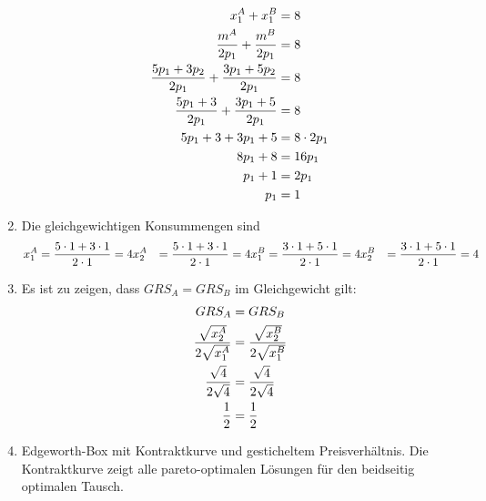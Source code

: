\documentclass{article}
\begin{document}
\begin{enumerate}[label=(\alph*)]
		\begin{align}
			x_1^A + x_1^B &= 8 \notag \\
			\frac{m^A}{2p_1} + \frac{m^B}{2p_1} &= 8 \notag \\
			\frac{5p_1 + 3p_2}{2p_1} + \frac{3p_1 + 5p_2}{2p_1} &= 8 \notag \\
			\frac{5p_1 + 3}{2p_1} + \frac{3p_1 + 5}{2p_1} &= 8 \notag \\
			5p_1 + 3 + 3p_1 + 5 &= 8\cdot 2p_1 \notag \\
			8p_1 + 8 &= 16p_1 \notag \\
			p_1 + 1 &= 2p_1 \notag \\
			p_1 &= 1 \notag
		\end{align}
		\item Die gleichgewichtigen Konsummengen sind
		\begin{align}
			x_1^A &= \frac{5\cdot 1 + 3\cdot 1}{2\cdot 1} = 4 \notag
			x_2^A &= \frac{5\cdot 1 + 3\cdot 1}{2\cdot 1} = 4 \notag
			x_1^B &= \frac{3\cdot 1 + 5\cdot 1}{2\cdot 1} = 4 \notag
			x_2^B &= \frac{3\cdot 1 + 5\cdot 1}{2\cdot 1} = 4 \notag
		\end{align}
		\item Es ist zu zeigen, dass $GRS_A=GRS_B$ im Gleichgewicht gilt:
		\begin{align}
			GRS_A &= GRS_B \notag \\
			\frac{\sqrt{x_2^A}}{2\sqrt{x_1^A}} &= \frac{\sqrt{x_2^B}}{2\sqrt{x_1^B}} \notag \\
			\frac{\sqrt{4}}{2\sqrt{4}} &= \frac{\sqrt{4}}{2\sqrt{4}} \notag \\
			\frac{1}{2} &= \frac{1}{2} \notag
		\end{align}
		\item Edgeworth-Box mit Kontraktkurve und gesticheltem Preisverhältnis. Die Kontraktkurve zeigt alle pareto-optimalen Lösungen für den beidseitig optimalen Tausch.
		\begin{center}
		\end{center}
	\end{enumerate}
\end{document}
